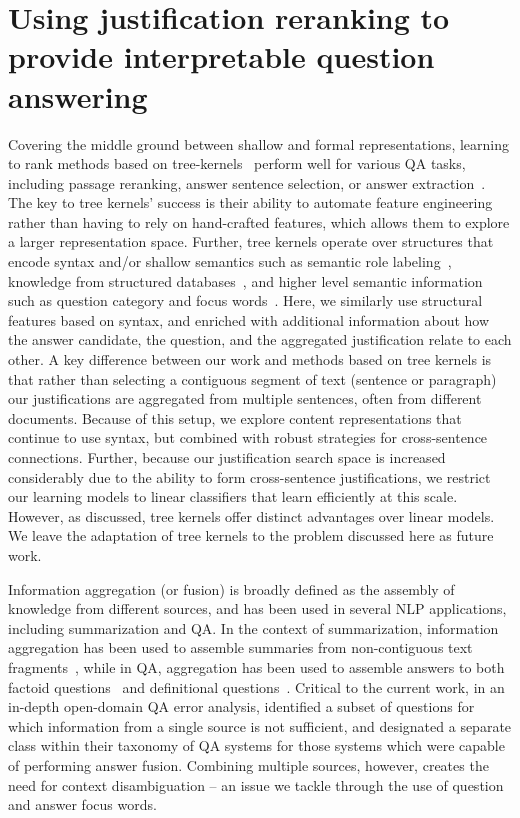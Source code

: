\section{Using justification reranking to provide interpretable question answering}
\label{sec-cl2017:relatedwork}


Covering the middle ground between shallow and formal representations, learning to rank methods based on tree-kernels~\citep{Moschitti:04} perform well for various QA tasks, including passage reranking, answer sentence selection, or answer extraction~\citep[inter alia]{Moschitti:07,Moschitti:11,Severyn:12,Severyn:13a,Severyn:13b,Tymoshenko:15}. 
The key to tree kernels' success is their ability to automate feature engineering rather than having to rely on hand-crafted features, which allows them to explore a larger representation space. Further, tree kernels operate over structures that encode syntax and/or shallow semantics such as semantic role labeling~\citep{Severyn:12}, knowledge from structured databases~\citep{Tymoshenko:15}, and higher level semantic information such as question category and focus words~\citep{Severyn:13b}.
Here, we similarly use structural features based on syntax, and enriched with additional information about how the answer candidate, the question, and the aggregated justification relate to each other.  
A key difference between our work and methods based on tree kernels is that rather than selecting a contiguous segment of text (sentence or paragraph) our justifications are aggregated from multiple sentences, often from different documents. Because of this setup, we explore content representations that continue to use syntax, but combined with robust strategies for cross-sentence connections. Further, because our justification search space is increased considerably due to the ability to form cross-sentence justifications, we restrict our learning models to linear classifiers that learn efficiently at this scale. However, as discussed, tree kernels offer distinct advantages over linear models. We leave the adaptation of tree kernels to the problem discussed here as future work.


Information aggregation (or fusion) is broadly defined as the assembly of knowledge from different sources, and has been used in several NLP applications, including summarization and QA.  In the context of summarization, information aggregation has been used to assemble summaries from non-contiguous text fragments~\citep[inter alia]{barzilay1999information,barzilay2005sentence}, while in QA, aggregation has been used to assemble answers to both factoid questions~\citep{pradhan2002building} and definitional questions~\citep{blair2003hybrid}.  Critical to the current work, in an in-depth open-domain QA error analysis, \citet{Moldovan:2003:PIE:763693.763694} identified a subset of questions for which information from a single source is not sufficient, and designated a separate class within their taxonomy of QA systems for those systems which were capable of performing answer fusion. Combining multiple sources, however, creates the need for context disambiguation -- an issue we tackle through the use of question and answer focus words.

